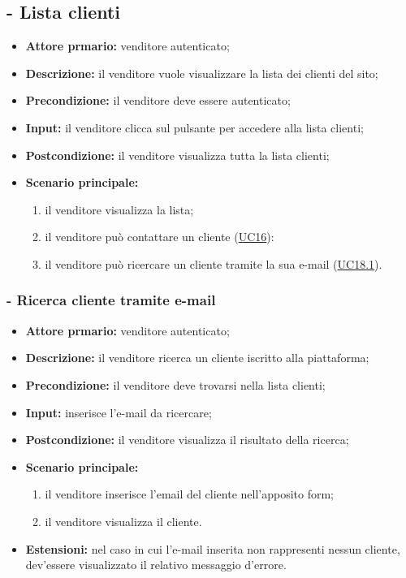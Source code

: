 \stepUserCase
\subsection{ - Lista clienti}
\begin{itemize}
    \item \textbf{Attore prmario:} venditore autenticato;
    \item \textbf{Descrizione:} il venditore vuole visualizzare la lista dei clienti del sito;
    \item \textbf{Precondizione:} il venditore deve essere autenticato;
    \item \textbf{Input:} il venditore clicca sul pulsante per accedere alla lista clienti;
    \item \textbf{Postcondizione:} il venditore visualizza tutta la lista clienti;
    \item \textbf{Scenario principale:}
          \begin{enumerate}
              \item il venditore visualizza la lista;
              \item il venditore può contattare un cliente (\hyperref[UC16]{UC16}):
              \item il venditore può ricercare un cliente tramite la sua e-mail (\hyperref[UC18.1]{UC18.1}).
          \end{enumerate}
\end{itemize}

\stepsubUserCase
\subsubsection{- Ricerca cliente tramite e-mail}
\begin{itemize}
    \item \textbf{Attore prmario:} venditore autenticato;
    \item \textbf{Descrizione:} il venditore ricerca un cliente iscritto alla piattaforma;
    \item \textbf{Precondizione:} il venditore deve trovarsi nella lista clienti;
    \item \textbf{Input:} inserisce l'e-mail da ricercare;
    \item \textbf{Postcondizione:} il venditore visualizza il risultato della ricerca;
    \item \textbf{Scenario principale:}
          \begin{enumerate}
              \item il venditore inserisce l'email del cliente nell'apposito form;
              \item il venditore visualizza il cliente.
          \end{enumerate}
    \item \textbf{Estensioni:} nel caso in cui l'e-mail inserita non rappresenti nessun cliente, dev'essere visualizzato il relativo messaggio d'errore.
\end{itemize}



